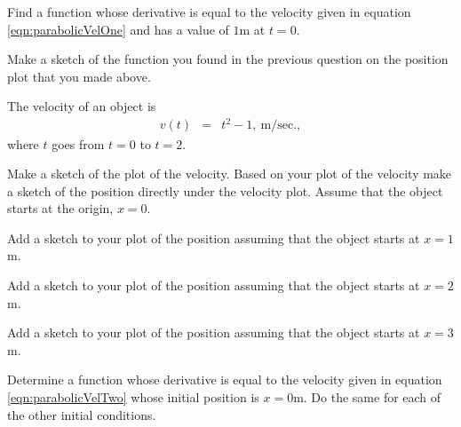 \begin{problem}
\begin{subproblem}
  \item Find a function whose derivative is equal to the velocity
    given in equation \ref{eqn:parabolicVelOne} and has a value of
    $1$m at $t=0$.

    \vspace{6em}

  \item Make a sketch of the function you found in the previous
    question on the position plot that you made above.

  \end{subproblem}

  \clearpage

\item The velocity of an object is
  \begin{eqnarray}
    \label{eqn:parabolicVelTwo}
    v(t) & = & t^2  - 1, ~ \mathrm{m/sec.},
  \end{eqnarray}
  where $t$ goes from $t=0$ to $t=2$.

  \begin{subproblem}
  \item Make a sketch of the plot of the velocity.  Based on your plot
    of the velocity make a sketch of the position directly under the velocity
    plot. Assume that the object starts at the origin, $x=0$.

    \vfill

  \item Add a sketch to your plot of the position assuming that the object starts
    at $x=1$m.

  \item Add a sketch to your plot of the position assuming that the object starts
    at $x=2$m.

  \item Add a sketch to your plot of the position assuming that the object starts
    at $x=3$m.

  \item Determine a function whose derivative is equal to the velocity
    given in equation \ref{eqn:parabolicVelTwo} whose initial position
    is $x=0$m. Do the same for each of the other initial conditions.

    \vspace{3em}

  \end{subproblem}

\postClass


\end{problem}
